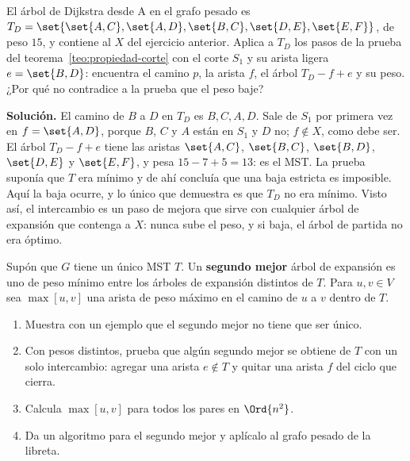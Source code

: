 \documentclass[11pt,letterpaper]{article}
\begin{document}
\begin{ejercicio}
  \label{ej:intercambio-dijkstra-mst}
  El árbol de Dijkstra desde A en el grafo pesado es
  $T_D = \set{\set{A,C}, \set{A,D}, \set{B,C}, \set{D,E}, \set{E,F}}$,
  de peso $15$, y contiene al $X$ del ejercicio anterior. Aplica a
  $T_D$ los pasos de la prueba del teorema~\ref{teo:propiedad-corte}
  con el corte $S_1$ y su arista ligera $e = \set{B, D}$: encuentra el
  camino $p$, la arista $f$, el árbol $T_D - f + e$ y su peso. ¿Por qué
  no contradice a la prueba que el peso baje?
\end{ejercicio}

\textbf{Solución.} El camino de $B$ a $D$ en $T_D$ es $B, C, A, D$.
Sale de $S_1$ por primera vez en $f = \set{A, D}$, porque $B$, $C$ y
$A$ están en $S_1$ y $D$ no; $f \notin X$, como debe ser. El árbol
$T_D - f + e$ tiene las aristas $\set{A,C}$, $\set{B,C}$, $\set{B,D}$,
$\set{D,E}$ y $\set{E,F}$, y pesa $15 - 7 + 5 = 13$: es el MST. La
prueba suponía que
$T$ era mínimo y de ahí concluía que una baja estricta es imposible.
Aquí la baja ocurre, y lo único que demuestra es que $T_D$ no era
mínimo. Visto así, el intercambio es un paso de mejora que sirve con
cualquier árbol de expansión que contenga a $X$: nunca sube el peso, y
si baja, el árbol de partida no era óptimo.

\begin{ejercicio}
  \label{ej:segundo-mejor-mst}
  Supón que $G$ tiene un único MST $T$. Un \textbf{segundo mejor}
  árbol de expansión es uno de peso mínimo entre los árboles de
  expansión distintos de $T$. Para $u, v \in V$ sea $\max[u, v]$ una
  arista de peso máximo en el camino de $u$ a $v$ dentro de $T$.
  \begin{enumerate}[label=(\alph*), itemsep=0.1em]
    \item Muestra con un ejemplo que el segundo mejor no tiene que ser
          único.
    \item Con pesos distintos, prueba que algún segundo mejor se
          obtiene de $T$ con un solo intercambio: agregar una arista
          $e \notin T$ y quitar una arista $f$ del ciclo que cierra.
    \item Calcula $\max[u, v]$ para todos los pares en $\Ord{n^2}$.
    \item Da un algoritmo para el segundo mejor y aplícalo al grafo
          pesado de la libreta.
  \end{enumerate}
\end{ejercicio}
\end{document}
